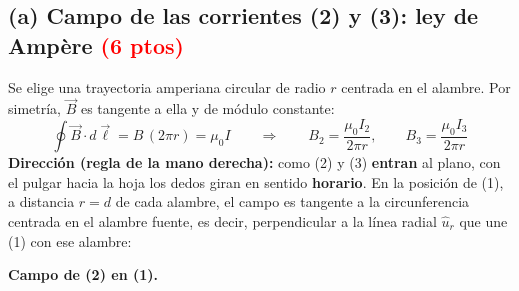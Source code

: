 \documentclass[12pt,letterpaper]{article}
\newcommand{\ptos}[1]{\textcolor{red}{\textbf{(#1 ptos)}}}
\begin{document}
\subsection*{(a) Campo de las corrientes (2) y (3): ley de Amp\`ere \ptos{6}}

\noindent Se elige una trayectoria amperiana circular de radio $r$ centrada en el alambre. Por
simetr\'ia, $\vec{B}$ es tangente a ella y de m\'odulo constante:
\[
    \oint\vec{B}\cdot d\vec{\ell} = B\,(2\pi r) = \mu_0 I
    \qquad\Longrightarrow\qquad
    B_2 = \frac{\mu_0 I_2}{2\pi r},\qquad B_3 = \frac{\mu_0 I_3}{2\pi r}
\]
\noindent\textbf{Direcci\'on (regla de la mano derecha):} como (2) y (3) \textbf{entran} al plano,
con el pulgar hacia la hoja los dedos giran en sentido \textbf{horario}. En la posici\'on de (1),
a distancia $r = d$ de cada alambre, el campo es tangente a la circunferencia centrada en el alambre
fuente, es decir, perpendicular a la l\'inea radial $\hat{u}_r$ que une (1) con ese alambre:

\medskip
\noindent\textbf{Campo de (2) en (1).}
\end{document}
